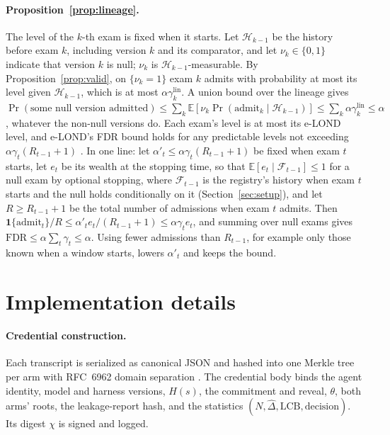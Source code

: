 \paragraph{Proposition~\ref{prop:lineage}.} The level of the $k$-th exam is fixed when it starts. Let $\mathcal H_{k-1}$ be the history before exam $k$, including version $k$ and its comparator, and let $\nu_k\in\{0,1\}$ indicate that version $k$ is null; $\nu_k$ is $\mathcal H_{k-1}$-measurable. By Proposition~\ref{prop:valid}, on $\{\nu_k=1\}$ exam $k$ admits with probability at most its level given $\mathcal H_{k-1}$, which is at most $\alpha\gamma^{\text{lin}}_k$. A union bound over the lineage gives $\Pr(\text{some null version admitted})\le\sum_k\mathbb E[\nu_k\Pr(\text{admit}_k\mid\mathcal H_{k-1})]\le\sum_k\alpha\gamma^{\text{lin}}_k\le\alpha$, whatever the non-null versions do. Each exam's level is at most its e-LOND level, and e-LOND's FDR bound holds for any predictable levels not exceeding $\alpha\gamma_t(R_{t-1}+1)$ \citep{xu2024online}. In one line: let $\alpha'_t\le\alpha\gamma_t(R_{t-1}+1)$ be fixed when exam $t$ starts, let $e_t$ be its wealth at the stopping time, so that $\mathbb E[e_t\mid\mathcal F_{t-1}]\le1$ for a null exam by optional stopping, where $\mathcal F_{t-1}$ is the registry's history when exam $t$ starts and the null holds conditionally on it (Section~\ref{sec:setup}), and let $R\ge R_{t-1}+1$ be the total number of admissions when exam $t$ admits. Then $\mathbf 1\{\text{admit}_t\}/R\le\alpha'_t e_t/(R_{t-1}+1)\le\alpha\gamma_t e_t$, and summing over null exams gives $\mathrm{FDR}\le\alpha\sum_t\gamma_t\le\alpha$. Using fewer admissions than $R_{t-1}$, for example only those known when a window starts, lowers $\alpha'_t$ and keeps the bound.

\section{Implementation details}
\label{app:impl}
\paragraph{Credential construction.} Each transcript is serialized as canonical JSON \citep{rundgren2020jcs} and hashed into one Merkle tree per arm with RFC~6962 domain separation \citep{laurie2013ct,merkle1988digital}. The credential body binds the agent identity, model and harness versions, $H(s)$, the commitment and reveal, $\theta$, both arms' roots, the leakage-report hash, and the statistics $(N,\hat\Delta,\mathrm{LCB},\text{decision})$. Its digest $\chi$ is signed and logged.

